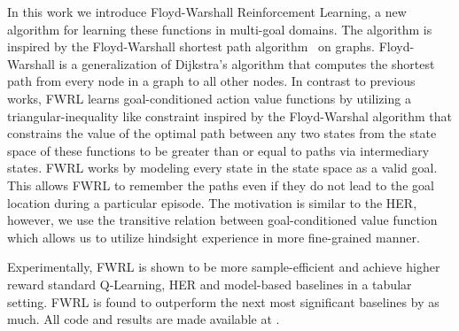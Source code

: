 In this work we introduce Floyd-Warshall Reinforcement Learning, a new
algorithm for learning these functions in multi-goal domains. The
algorithm is inspired by the Floyd-Warshall shortest path
algorithm~\cite{floydwarshall1962} on graphs. Floyd-Warshall is a
generalization of Dijkstra's algorithm that computes the shortest path
from every node in a graph to all other nodes. In contrast to previous
works, FWRL learns goal-conditioned action value functions by utilizing
a triangular-inequality like constraint inspired by the Floyd-Warshal
algorithm that constrains the value of the optimal path between any two
states from the state space of these functions to be greater than or
equal to paths via intermediary states. FWRL works by modeling every
state in the state space as a valid goal. This allows FWRL to remember
the paths even if they do not lead to the goal location during a
particular episode. The motivation is similar to the HER, however, we
use the transitive relation between goal-conditioned value function
which allows us to utilize hindsight experience in more fine-grained
manner.

Experimentally, FWRL is shown to be more sample-efficient and achieve
higher reward standard Q-Learning, HER and model-based baselines in a
tabular setting.  FWRL is found to outperform the next most significant
baselines by as much. All code and results are made available at
\href{}{}. 





